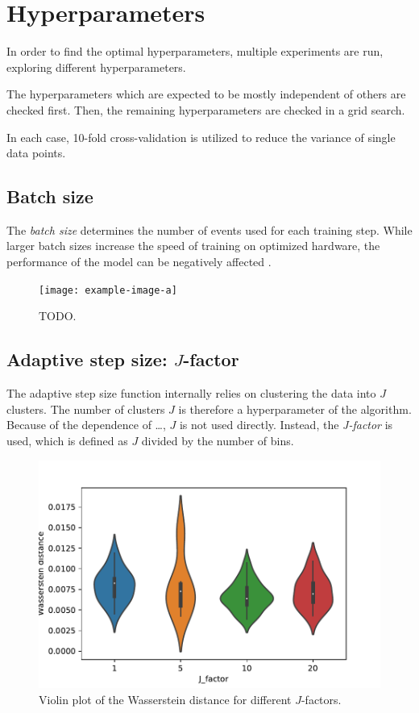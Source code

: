 \section{Hyperparameters}
In order to find the optimal hyperparameters,
multiple experiments are run,
exploring different hyperparameters.

The hyperparameters which are expected to be mostly independent of others are checked first.
Then, the remaining hyperparameters are checked in a grid search. %

In each case, 10-fold cross-validation is utilized to reduce the variance of single data points.


\subsection{Batch size}
The \emph{batch size} determines the number of events used for each training step.
While larger batch sizes increase the speed of training
on optimized hardware,
the performance of the model can be negatively affected \cite{batchsize_kandel}.

\begin{figure}
  \centering
  \texttt{[image: example-image-a]}
  \caption{TODO.}
  \label{fig:hyperparameter:batch_size}
\end{figure}


\subsection{Adaptive step size: $J$-factor}
The adaptive step size function internally relies on clustering the data into $J$ clusters.
The number of clusters $J$ is therefore a hyperparameter of the algorithm.
Because of the dependence of …,
$J$ is not used directly.
Instead, the \emph{J-factor} is used,
which is defined as $J$ divided by the number of bins.

\begin{figure}
  \centering
  \includegraphics[scale=1]{content/plots/halftime/wd_per_J_factor.pdf}
  \caption{Violin plot of the Wasserstein distance for different $J$-factors.}
  \label{fig:hyperparameter:J_factor}
\end{figure}


